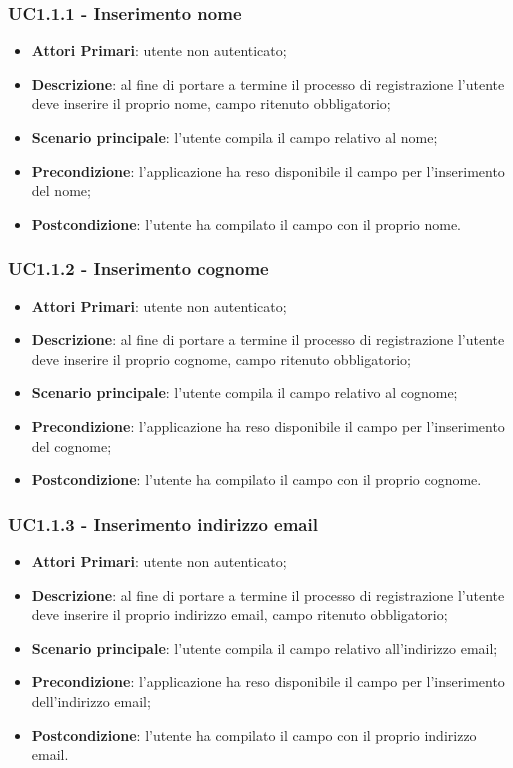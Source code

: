 \subsubsection{UC1.1.1 - Inserimento nome}
\begin{itemize}
	\item \textbf{Attori Primari}: utente non autenticato;
	\item \textbf{Descrizione}: al fine di portare a termine il processo di registrazione l'utente deve inserire il proprio nome, campo ritenuto obbligatorio;
	\item \textbf{Scenario principale}: l'utente compila il campo relativo al nome;	
	\item \textbf{Precondizione}: l'applicazione ha reso disponibile il campo per l'inserimento del nome;
	\item \textbf{Postcondizione}: l'utente ha compilato il campo con il proprio nome.	
\end{itemize}
\subsubsection{UC1.1.2 - Inserimento cognome}
\begin{itemize}
	\item \textbf{Attori Primari}: utente non autenticato;
	\item \textbf{Descrizione}: al fine di portare a termine il processo di registrazione l'utente deve inserire il proprio cognome, campo ritenuto obbligatorio;
	\item \textbf{Scenario principale}: l'utente compila il campo relativo al cognome;	
	\item \textbf{Precondizione}: l'applicazione ha reso disponibile il campo per l'inserimento del cognome;
	\item \textbf{Postcondizione}: l'utente ha compilato il campo con il proprio cognome.	
\end{itemize}
\subsubsection{UC1.1.3 - Inserimento indirizzo email}
\begin{itemize}
	\item \textbf{Attori Primari}: utente non autenticato;
	\item \textbf{Descrizione}: al fine di portare a termine il processo di registrazione l'utente deve inserire il proprio indirizzo email, campo ritenuto obbligatorio;
	\item \textbf{Scenario principale}: l'utente compila il campo relativo all'indirizzo email;	
	\item \textbf{Precondizione}: l'applicazione ha reso disponibile il campo per l'inserimento dell'indirizzo email;
	\item \textbf{Postcondizione}: l'utente ha compilato il campo con il proprio indirizzo email.
\end{itemize}
